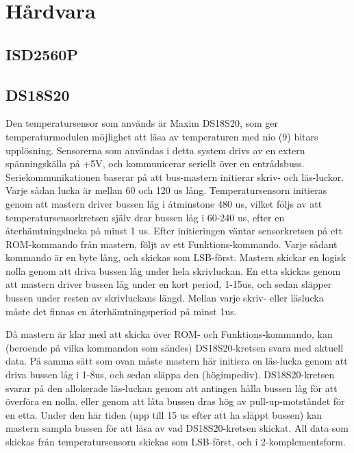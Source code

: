 \documentclass[a4paper,11pt]{article}
\begin{document}
\section{Hårdvara}
\label{hårdvara}
	\subsection{ISD2560P}

	\subsection{DS18S20}
	\label{DS18S20}
		Den temperatursensor som används är Maxim DS18S20, som ger temperaturmodulen möjlighet att läsa av temperaturen
		med nio (9) bitars upplösning. Sensorerna som användas i detta system drivs av en extern spänningskälla på +5V,
		och kommunicerar seriellt över en entrådsbuss. Seriekommunikationen baserar på att bus-mastern initierar skriv-
		och läs-luckor. Varje sådan lucka är mellan 60 och 120 us lång. Temperatursensorn initieras genom att mastern
		driver bussen låg i åtminstone 480 us, vilket följs av att temperatursensorkretsen själv drar bussen låg i 60-240 us,
		efter en återhämtningslucka på minst 1 us. Efter initieringen väntar sensorkretsen på ett ROM-kommando från mastern,
		följt av ett Funktions-kommando. Varje sådant kommando är en byte lång, och skickas som LSB-först. Mastern skickar
		en logisk nolla genom att driva bussen låg under hela skrivluckan. En etta skickas genom att mastern driver bussen låg
		under en kort period, 1-15us, och sedan släpper bussen under resten av skrivluckans längd. Mellan varje skriv- eller läslucka
		måste det finnas en återhämtningsperiod på minst 1us.

		Då mastern är klar med att skicka över ROM- och Funktions-kommando, kan (beroende på vilka kommandon som sändes) DS18S20-kretsen
		svara med aktuell data. På samma sätt som ovan måste mastern här initiera en läs-lucka genom att driva bussen låg i 1-8us, och
		sedan släppa den (högimpediv). DS18S20-kretsen svarar på den allokerade läs-luckan genom att antingen hålla bussen låg för att
		överföra en nolla, eller genom att låta bussen dras hög av pull-up-motståndet för en etta. Under den här tiden (upp till 15 us
		efter att ha släppt bussen) kan mastern sampla bussen för att läsa av vad DS18S20-kretsen skickat. All data som skickas från
		temperatursensorn skickas som LSB-först, och i 2-komplementsform.\\
\end{document}
